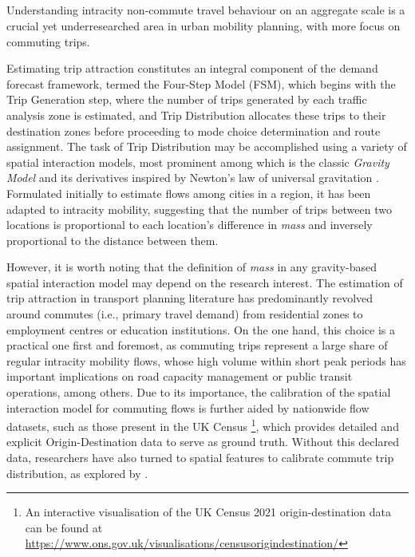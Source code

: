 
\subsection*{}

Understanding intracity non-commute travel behaviour on an aggregate scale is a crucial yet underresearched area in urban mobility planning, with more focus on commuting trips.

Estimating trip attraction constitutes an integral component of the demand forecast framework, termed the Four-Step Model (FSM), which begins with the Trip Generation step, where the number of trips generated by each traffic analysis zone is estimated, and Trip Distribution allocates these trips to their destination zones before proceeding to mode choice determination and route assignment. The task of Trip Distribution may be accomplished using a variety of spatial interaction models, most prominent among which is the classic \textit{Gravity Model} and its derivatives inspired by Newton's law of universal gravitation \citep{erlanderGravityModelTransportation1990}. Formulated initially to estimate flows among cities in a region, it has been adapted to intracity mobility, suggesting that the number of trips between two locations is proportional to each location's difference in \textit{mass} and inversely proportional to the distance between them. 

However, it is worth noting that the definition of \textit{mass} in any gravity-based spatial interaction model may depend on the research interest. The estimation of trip attraction in transport planning literature has predominantly revolved around commutes (i.e., primary travel demand) from residential zones to employment centres or education institutions. On the one hand, this choice is a practical one first and foremost, as commuting trips represent a large share of regular intracity mobility flows, whose high volume within short peak periods has important implications on road capacity management or public transit operations, among others. Due to its importance, the calibration of the spatial interaction model for commuting flows is further aided by nationwide flow datasets, such as those present in the UK Census \footnote{An interactive visualisation of the UK Census 2021 origin-destination data can be found at \url{https://www.ons.gov.uk/visualisations/censusorigindestination/}}, which provides detailed and explicit Origin-Destination data to serve as ground truth. Without this declared data, researchers have also turned to spatial features to calibrate commute trip distribution, as explored by \cite{yangLimitsPredictabilityCommuting2014}.

